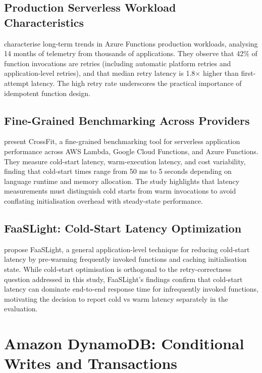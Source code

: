 \subsection{Production Serverless Workload Characteristics}

\citet{Joosen2023Production} characterise long-term trends in Azure Functions production workloads, analysing 14 months of telemetry from thousands of applications. They observe that 42\% of function invocations are retries (including automatic platform retries and application-level retries), and that median retry latency is 1.8$\times$ higher than first-attempt latency. The high retry rate underscores the practical importance of idempotent function design.

\subsection{Fine-Grained Benchmarking Across Providers}

\citet{Scheuner2022CrossFit} present CrossFit, a fine-grained benchmarking tool for serverless application performance across AWS Lambda, Google Cloud Functions, and Azure Functions. They measure cold-start latency, warm-execution latency, and cost variability, finding that cold-start times range from 50 ms to 5 seconds depending on language runtime and memory allocation. The study highlights that latency measurements must distinguish cold starts from warm invocations to avoid conflating initialisation overhead with steady-state performance.

\subsection{FaaSLight: Cold-Start Latency Optimization}

\citet{Liu2023FaaSLight} propose FaaSLight, a general application-level technique for reducing cold-start latency by pre-warming frequently invoked functions and caching initialisation state. While cold-start optimisation is orthogonal to the retry-correctness question addressed in this study, FaaSLight's findings confirm that cold-start latency can dominate end-to-end response time for infrequently invoked functions, motivating the decision to report cold vs warm latency separately in the evaluation.

\section{Amazon DynamoDB: Conditional Writes and Transactions}

